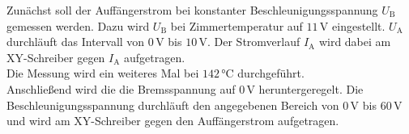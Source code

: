 Zunächst soll der Auffängerstrom bei konstanter Beschleunigungsspannung $U_\text{B}$ gemessen werden.
Dazu wird $U_\text{B}$ bei Zimmertemperatur auf $11 \,\unit{\volt}$ eingestellt.
$U_\text{A}$ durchläuft das Intervall von $0 \,\unit{\volt}$ bis $10 \,\unit{\volt}$.
Der Stromverlauf $I_\text{A}$ wird dabei am XY-Schreiber gegen $I_\text{A}$ aufgetragen. \\

Die Messung wird ein weiteres Mal bei $142 \,\unit{\celsius}$ durchgeführt. \\

Anschließend wird die die Bremsspannung auf $0 \,\unit{\volt}$ heruntergeregelt.
Die Beschleunigungsspannung durchläuft den angegebenen Bereich von
$0 \,\unit{\volt}$ bis $60 \,\unit{\volt}$ und wird am XY-Schreiber gegen den Auffängerstrom aufgetragen.



